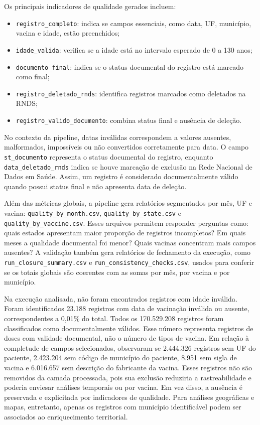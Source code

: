 \documentclass[12pt]{article}
\begin{document}
Os principais indicadores de qualidade gerados incluem:

\begin{itemize}
    \item \texttt{registro\_completo}: indica se campos essenciais, como data, UF, município, vacina e idade, estão preenchidos;
    \item \texttt{idade\_valida}: verifica se a idade está no intervalo esperado de 0 a 130 anos;
    \item \texttt{documento\_final}: indica se o status documental do registro está marcado como final;
    \item \texttt{registro\_deletado\_rnds}: identifica registros marcados como deletados na RNDS;
    \item \texttt{registro\_valido\_documento}: combina status final e ausência de deleção.
\end{itemize}

No contexto da pipeline, datas inválidas correspondem a valores ausentes, malformados, impossíveis ou não convertidos corretamente para data. O campo \texttt{st\_documento} representa o status documental do registro, enquanto \texttt{data\_deletado\_rnds} indica se houve marcação de exclusão na Rede Nacional de Dados em Saúde. Assim, um registro é considerado documentalmente válido quando possui status final e não apresenta data de deleção.

Além das métricas globais, a pipeline gera relatórios segmentados por mês, UF e vacina: \texttt{quality\_by\_month.csv}, \texttt{quality\_by\_state.csv} e \texttt{quality\_by\_vaccine.csv}. Esses arquivos permitem responder perguntas como: quais estados apresentam maior proporção de registros incompletos? Em quais meses a qualidade documental foi menor? Quais vacinas concentram mais campos ausentes? A validação também gera relatórios de fechamento da execução, como \texttt{run\_closure\_summary.csv} e \texttt{run\_consistency\_checks.csv}, usados para conferir se os totais globais são coerentes com as somas por mês, por vacina e por município.

Na execução analisada, não foram encontrados registros com idade inválida. Foram identificados 23.188 registros com data de vacinação inválida ou ausente, correspondentes a 0,01\% do total. Todos os 170.529.208 registros foram classificados como documentalmente válidos. Esse número representa registros de doses com validade documental, não o número de tipos de vacina. Em relação à completude de campos selecionados, observaram-se 2.444.326 registros sem UF do paciente, 2.423.204 sem código de município do paciente, 8.951 sem sigla de vacina e 6.016.657 sem descrição do fabricante da vacina. Esses registros não são removidos da camada processada, pois sua exclusão reduziria a rastreabilidade e poderia enviesar análises temporais ou por vacina. Em vez disso, a ausência é preservada e explicitada por indicadores de qualidade. Para análises geográficas e mapas, entretanto, apenas os registros com município identificável podem ser associados ao enriquecimento territorial.
\end{document}
